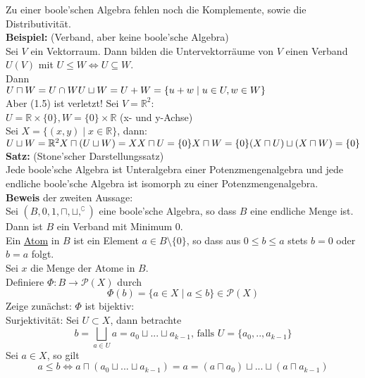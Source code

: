 \documentclass[a4paper]{scrartcl}
\begin{document}
Zu einer boole'schen Algebra fehlen noch die Komplemente, sowie die Distributivität.\medskip\\
\textbf{Beispiel:} (Verband, aber keine boole'sche Algebra)\\
Sei $V$ ein Vektorraum. Dann bilden die Untervektorräume von $V$ einen Verband $U(V)$ mit $U \leq W \Leftrightarrow U \subseteq W$.\\Dann\\
$U \sqcap W = U \cap W\\U\sqcup W = U + W =\{u+w\mid u \in U, w \in W\}$\\
Aber (1.5) ist verletzt! Sei $V = \mathbb{R}^2$:\\
$U = \mathbb{R} \times \{0\}, W = \{0\} \times \mathbb{R}$ (x- und y-Achse)\\
Sei $X = \{(x,y) \mid x \in \mathbb{R}\}$, dann:\\
$U \sqcup W = \mathbb{R}^2\\
X \sqcap (U \sqcup W) = X\\
X \sqcap U = \{0\}\\
X \sqcap W = \{0\}\\
(X \sqcap U)\sqcup (X \sqcap W) = \{0\}$\medskip\\
\textbf{Satz:} (Stone'scher Darstellungssatz)\\
Jede boole'sche Algebra ist Unteralgebra einer Potenzmengenalgebra und jede endliche boole'sche Algebra ist isomorph zu einer Potenzmengenalgebra. \medskip\\
\textbf{Beweis} der zweiten Aussage:\\
Sei $(B,0,1,\sqcap,\sqcup,^\complement)$ eine boole'sche Algebra, so dass $B$ eine endliche Menge ist.\\
Dann ist $B$ ein Verband mit Minimum $0$.\medskip\\
Ein \underline{Atom} in $B$ ist ein Element $a \in B\setminus\{0\}$, so dass aus $0 \leq b \leq a$ stets $b=0$ oder $b=a$ folgt.\medskip\\
Sei $x$ die Menge der Atome in $B$.\\
Definiere $\Phi: B\rightarrow \mathcal{P}(X)$ durch
$$\Phi(b) = \{a \in X \mid a \leq b\} \in \mathcal{P}(X)$$
Zeige zunächst: $\Phi$ ist bijektiv:\\
Surjektivität: Sei $U \subset X$, dann betrachte
$$b=\bigsqcup_{a \in U} a = a_0\sqcup ... \sqcup a_{k-1}\text{, falls } U=\{a_0,..,a_{k-1}\}$$
Sei $a \in X$, so gilt
$$a \leq b \Leftrightarrow a \sqcap(a_0 \sqcup...\sqcup a_{k-1}) = a = (a \sqcap a_0) \sqcup ... \sqcup (a \sqcap a_{k-1})$$
\end{document}
